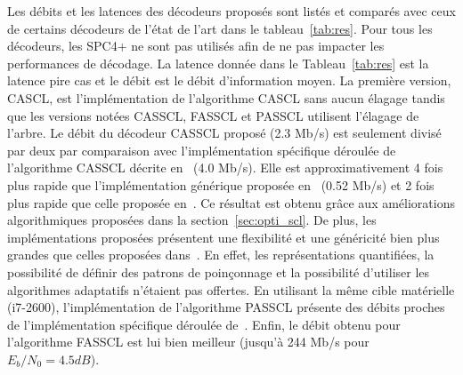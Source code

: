 Les débits et les latences des décodeurs proposés sont listés et comparés avec ceux de certains décodeurs de l'état de l'art dans le tableau~\ref{tab:res}. Pour tous les décodeurs, les \noeuds SPC4+ ne sont pas utilisés afin de ne pas impacter les performances de décodage. La latence donnée dans le Tableau~\ref{tab:res} est la latence \og pire cas \fg et le débit est le débit d'information moyen. La première version, CASCL, est l'implémentation de l'algorithme CASCL sans aucun élagage tandis que les versions notées CASSCL, FASSCL et PASSCL utilisent l'élagage de l'arbre. Le débit du décodeur CASSCL proposé (2.3 Mb/s) est seulement divisé par deux par comparaison avec l'implémentation spécifique déroulée de l'algorithme CASSCL décrite en~\cite{sarkis_fast_2016} (4.0 Mb/s). Elle est approximativement 4 fois plus rapide que l'implémentation générique proposée en~\cite{sarkis_increasing_2014} (0.52 Mb/s) et 2 fois plus rapide que celle proposée en~\cite{shen_low-latency_2016}. Ce résultat est obtenu grâce aux améliorations algorithmiques proposées dans la section~\ref{sec:opti_scl}. De plus, les implémentations proposées présentent une flexibilité et une généricité bien plus grandes que celles proposées dans~\cite{sarkis_increasing_2014,shen_low-latency_2016}. En effet, les représentations quantifiées, la possibilité de définir des patrons de poinçonnage et la possibilité d'utiliser les algorithmes adaptatifs n'étaient pas offertes. En utilisant la même cible matérielle (i7-2600), l'implémentation de l'algorithme PASSCL présente des débits proches de l'implémentation spécifique déroulée de~\cite{sarkis_fast_2016}. Enfin, le débit obtenu pour l'algorithme FASSCL est lui bien meilleur (jusqu'à 244 Mb/s pour $E_b/N_0=4.5dB$).

